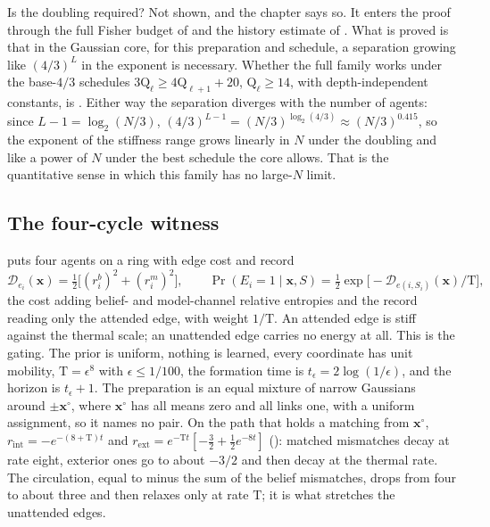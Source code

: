 Is the doubling required? Not shown, and the chapter says so. It enters the proof through the full Fisher
budget of  and the history estimate of
. What is proved is that in the Gaussian core, for this preparation and
schedule, a separation growing like \((4/3)^L\) in the exponent is necessary. Whether the full family works
under the base-\(4/3\) schedules \(3\mathrm Q_\ell\ge4\mathrm Q_{\ell+1}+20\), \(\mathrm Q_\ell\ge14\), with
depth-independent constants, is . Either way the separation diverges
with the number of agents: since \(L-1=\log_2(N/3)\), \((4/3)^{L-1}=(N/3)^{\log_2(4/3)}\approx(N/3)^{0.415}\), so
the exponent of the stiffness range grows linearly in \(N\) under the doubling and like a power of \(N\) under
the best schedule the core allows. That is the quantitative sense in which this family has no large-\(N\)
limit.

\subsection{The four-cycle witness}
\label{comp:ch13-cycle}

 puts four agents on a ring with edge cost and record
\[
\mathcal D_{e_i}(\mathbf x)=\tfrac12\bigl[(r^b_i)^2+(r^m_i)^2\bigr],
\qquad
\Pr(E_i=1\mid\mathbf x,S)=\tfrac12\exp\bigl[-\mathcal D_{e(i,S_i)}(\mathbf x)/\mathrm T\bigr],
\]
the cost adding belief- and model-channel relative entropies and the record reading only the attended
edge, with weight \(1/\mathrm T\). An attended edge is stiff against the thermal scale; an unattended edge
carries no energy at all. This is the gating. The prior is uniform, nothing is learned, every coordinate
has unit mobility, \(\mathrm T=\epsilon^8\) with \(\epsilon\le1/100\), the formation time is
\(t_\epsilon=2\log(1/\epsilon)\), and the horizon is \(t_\epsilon+1\). The preparation is an equal mixture of
narrow Gaussians around \(\pm\mathbf x^\circ\), where \(\mathbf x^\circ\) has all means zero and all links one,
with a uniform assignment, so it names no pair. On the path that holds a matching from \(\mathbf x^\circ\),
\(r_{\mathrm{int}}=-e^{-(8+\mathrm T)t}\) and \(r_{\mathrm{ext}}=e^{-\mathrm Tt}[-\tfrac32+\tfrac12e^{-8t}]\)
(): matched mismatches decay at rate eight, exterior ones go to about
\(-3/2\) and then decay at the thermal rate. The circulation, equal to minus the sum of the belief mismatches,
drops from four to about three and then relaxes only at rate \(\mathrm T\); it is what stretches the
unattended edges.

